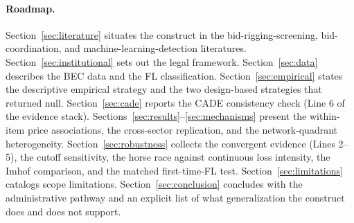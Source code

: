 \paragraph{Roadmap.}
Section~\ref{sec:literature} situates the construct in the
bid-rigging-screening, bid-coordination, and machine-learning-detection
literatures. Section~\ref{sec:institutional} sets out the legal
framework. Section~\ref{sec:data} describes the BEC data and the FL
classification. Section~\ref{sec:empirical} states the descriptive
empirical strategy and the two design-based strategies that returned
null. Section~\ref{sec:cade} reports the CADE consistency check
(Line 6 of the evidence stack). Sections~\ref{sec:results}--\ref{sec:mechanisms}
present the within-item price associations, the cross-sector
replication, and the network-quadrant heterogeneity.
Section~\ref{sec:robustness} collects the convergent evidence
(Lines 2--5), the cutoff sensitivity, the horse race against
continuous loss intensity, the Imhof comparison, and the matched
first-time-FL test. Section~\ref{sec:limitations} catalogs scope
limitations. Section~\ref{sec:conclusion} concludes with the
administrative pathway and an explicit list of what generalization
the construct does and does not support.
